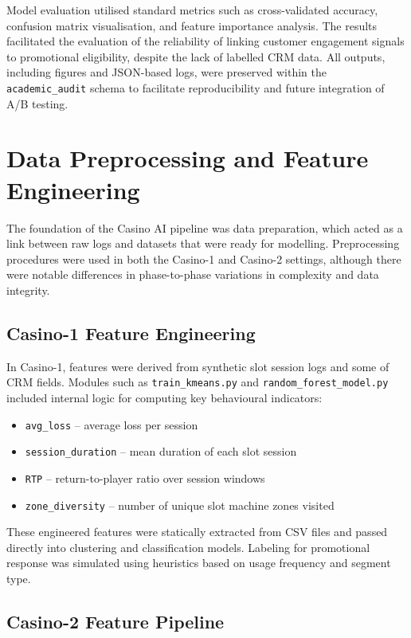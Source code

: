 \documentclass[12pt,a4paper]{report}
\begin{document}
 Model evaluation utilised standard metrics such as cross-validated accuracy, confusion matrix visualisation, and feature importance analysis.  The results facilitated the evaluation of the reliability of linking customer engagement signals to promotional eligibility, despite the lack of labelled CRM data.  All outputs, including figures and JSON-based logs, were preserved within the \texttt{academic\_audit} schema to facilitate reproducibility and future integration of A/B testing.


\section{Data Preprocessing and Feature Engineering}
\label{sec:data_preprocessing_feature_engineering}

The foundation of the Casino AI pipeline was data preparation, which acted as a link between raw logs and datasets that were ready for modelling.  Preprocessing procedures were used in both the Casino-1 and Casino-2 settings, although there were notable differences in phase-to-phase variations in complexity and data integrity.

\subsection*{Casino-1 Feature Engineering}

In Casino-1, features were derived from synthetic slot session logs and some of CRM fields. Modules such as \texttt{train\_kmeans.py} and \texttt{random\_forest\_model.py} included internal logic for computing key behavioural indicators:

\begin{itemize}
  \item \texttt{avg\_loss} – average loss per session
  \item \texttt{session\_duration} – mean duration of each slot session
  \item \texttt{RTP} – return-to-player ratio over session windows
  \item \texttt{zone\_diversity} – number of unique slot machine zones visited
\end{itemize}

These engineered features were statically extracted from CSV files and passed directly into clustering and classification models. Labeling for promotional response was simulated using heuristics based on usage frequency and segment type.

\subsection{Casino-2 Feature Pipeline}
\end{document}
